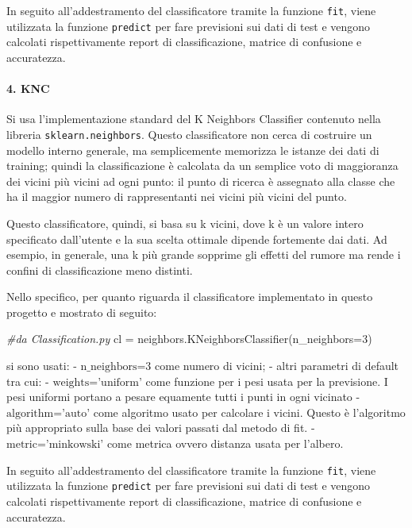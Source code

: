 \documentclass[11pt]{article}
\newenvironment{Shaded}{}{}
\newcommand{\DecValTok}[1]{\textcolor[rgb]{0.25,0.63,0.44}{{#1}}}
\newcommand{\CommentTok}[1]{\textcolor[rgb]{0.38,0.63,0.69}{\textit{{#1}}}}
\newcommand{\NormalTok}[1]{{#1}}
\newcommand{\OperatorTok}[1]{\textcolor[rgb]{0.40,0.40,0.40}{{#1}}}
\begin{document}
In seguito all'addestramento del classificatore tramite la funzione
\texttt{fit}, viene utilizzata la funzione \texttt{predict} per fare
previsioni sui dati di test e vengono calcolati rispettivamente report
di classificazione, matrice di confusione e accuratezza.

    \paragraph{4. KNC}\label{knc}

    Si usa l'implementazione standard del K Neighbors Classifier contenuto
nella libreria \texttt{sklearn.neighbors}. Questo classificatore non
cerca di costruire un modello interno generale, ma semplicemente
memorizza le istanze dei dati di training; quindi la classificazione è
calcolata da un semplice voto di maggioranza dei vicini più vicini ad
ogni punto: il punto di ricerca è assegnato alla classe che ha il
maggior numero di rappresentanti nei vicini più vicini del punto.

Questo classificatore, quindi, si basa su k vicini, dove k è un valore
intero specificato dall'utente e la sua scelta ottimale dipende
fortemente dai dati. Ad esempio, in generale, una k più grande sopprime
gli effetti del rumore ma rende i confini di classificazione meno
distinti.

Nello specifico, per quanto riguarda il classificatore implementato in
questo progetto e mostrato di seguito:

\begin{Shaded}
\begin{Highlighting}[]
\CommentTok{#da Classification.py}
\NormalTok{cl }\OperatorTok{=}\NormalTok{ neighbors.KNeighborsClassifier(n_neighbors}\OperatorTok{=}\DecValTok{3}\NormalTok{)       }
\end{Highlighting}
\end{Shaded}

si sono usati: - \(\text{n_neighbors=3}\) come numero di vicini; - altri
parametri di default tra cui: - \(\text{weights='uniform'}\) come
funzione per i pesi usata per la previsione. I pesi uniformi portano a
pesare equamente tutti i punti in ogni vicinato -
\(\text{algorithm='auto'}\) come algoritmo usato per calcolare i vicini.
Questo è l'algoritmo più appropriato sulla base dei valori passati dal
metodo di fit. - \(\text{metric='minkowski'}\) come metrica ovvero
distanza usata per l'albero.

In seguito all'addestramento del classificatore tramite la funzione
\texttt{fit}, viene utilizzata la funzione \texttt{predict} per fare
previsioni sui dati di test e vengono calcolati rispettivamente report
di classificazione, matrice di confusione e accuratezza.
\end{document}
